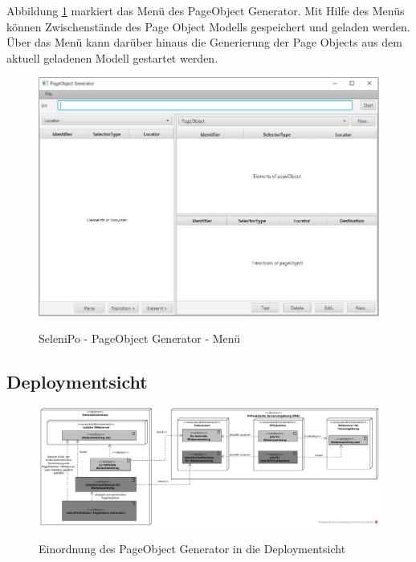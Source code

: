 \newpage

Abbildung \ref{fig:poGeneratorMenu} markiert das Menü des PageObject Generator. Mit Hilfe des Menüs können Zwischenstände des Page Object Modells gespeichert und geladen werden.
Über das Menü kann darüber hinaus die Generierung der Page Objects aus dem aktuell geladenen Modell gestartet werden.

\begin{figure}[htb]
  \centering  
  \includegraphics[scale=0.5]{img/poGeneratorMenu.JPG}\\
  \caption{SeleniPo - PageObject Generator - Menü}
  \label{fig:poGeneratorMenu}
\end{figure}

\subsection{Deploymentsicht}

\label{sec:deploymentsicht}
\begin{figure}[htb]
  \centering  
  \includegraphics[scale=0.32]{img/Deployment.jpg}\\
  \caption{Einordnung des PageObject Generator in die Deploymentsicht}
  \label{fig:deployment}
\end{figure}

